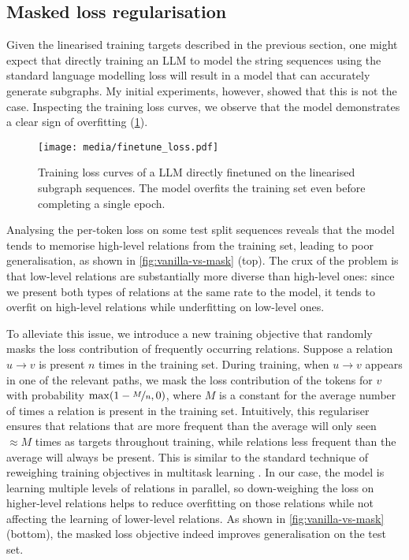 \subsection{Masked loss regularisation}

Given the linearised training targets described in the previous section, one might expect that directly training an LLM to model the string sequences using the standard language modelling loss will result in a model that can accurately generate subgraphs. My initial experiments, however, showed that this is not the case. Inspecting the training loss curves, we observe that the model demonstrates a clear sign of overfitting (\cref{fig:vanilla-loss-curves}).

\begin{figure}
    \centering
    \texttt{[image: media/finetune\_loss.pdf]}
    \captionsetup{width=0.6\linewidth}
    \caption{Training loss curves of a LLM directly finetuned on the linearised subgraph sequences. The model overfits the training set even before completing a single epoch.}
    \label{fig:vanilla-loss-curves}
\end{figure}

Analysing the per-token loss on some test split sequences reveals that the model tends to memorise high-level relations from the training set, leading to poor generalisation, as shown in \cref{fig:vanilla-vs-mask} (top). The crux of the problem is that low-level relations are substantially more diverse than high-level ones: since we present both types of relations at the same rate to the model, it tends to overfit on high-level relations while underfitting on low-level ones.



To alleviate this issue, we introduce a new training objective that randomly masks the loss contribution of frequently occurring relations. Suppose a relation $u \to v$ is present $n$ times in the training set. During training, when $u \to v$ appears in one of the relevant paths, we mask the loss contribution of the tokens for $v$ with probability $\max(1 - \nicefrac{M}{n}, 0)$, where $M$ is a constant for the average number of times a relation is present in the training set. Intuitively, this regulariser ensures that relations that are more frequent than the average will only seen $\approx\!M$ times as targets throughout training, while relations less frequent than the average will always be present. This is similar to the standard technique of reweighing training objectives in multitask learning \cite{caruana1997multitask}. In our case, the model is learning multiple levels of relations in parallel, so down-weighing the loss on higher-level relations helps to reduce overfitting on those relations while not affecting the learning of lower-level relations. As shown in \cref{fig:vanilla-vs-mask} (bottom), the masked loss objective indeed improves generalisation on the test set.

